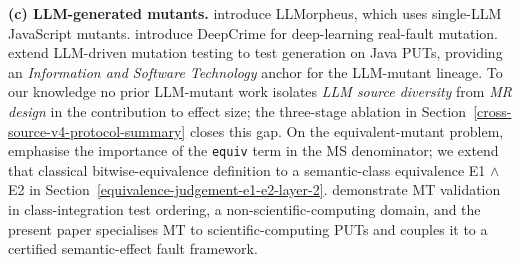 \documentclass[manuscript,screen,review]{acmart}
\begin{document}
\textbf{(c) LLM-generated mutants.} \citet{tip2025llmorpheus}
introduce LLMorpheus, which uses single-LLM JavaScript mutants.
\citet{humbatova2021deepcrime} introduce DeepCrime for
deep-learning real-fault mutation. \citet{dakhel2024llm} extend
LLM-driven mutation testing to test generation on Java PUTs, providing
an \emph{Information and Software Technology} anchor for the LLM-mutant
lineage. To our knowledge no prior LLM-mutant work isolates \emph{LLM
source diversity} from \emph{MR design} in the contribution to effect
size; the three-stage ablation in Section~\ref{cross-source-v4-protocol-summary} closes this gap. On the
equivalent-mutant problem, \citet{delgadoperez2020equivalent} emphasise
the importance of the \texttt{equiv} term in the MS denominator; we
extend that classical bitwise-equivalence definition to a semantic-class
equivalence E1 $\wedge$ E2 in Section~\ref{equivalence-judgement-e1-e2-layer-2}. \citet{zhang2021classintegration} demonstrate MT
validation in class-integration test ordering, a
non-scientific-computing domain, and the present paper specialises MT to
scientific-computing PUTs and couples it to a certified
semantic-effect fault framework.
\end{document}
